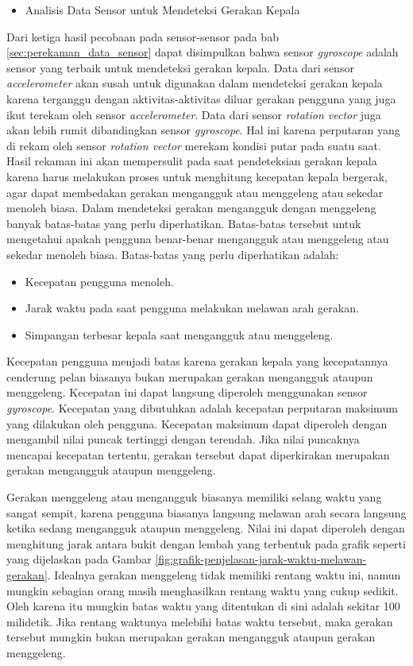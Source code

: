 \documentclass[a4paper,twoside]{article}
\begin{document}
\begin{enumerate}
\begin{itemize}
	\item Analisis Data Sensor untuk Mendeteksi Gerakan Kepala
\end{itemize}


Dari ketiga hasil pecobaan pada sensor-sensor pada bab \ref{sec:perekaman_data_sensor} dapat disimpulkan bahwa sensor \textit{gyroscope} adalah sensor yang terbaik untuk mendeteksi gerakan kepala. Data dari sensor \textit{accelerometer} akan susah untuk digunakan dalam mendeteksi gerakan kepala karena terganggu dengan aktivitas-aktivitas diluar gerakan pengguna yang juga ikut terekam oleh sensor \textit{accelerometer}. Data dari sensor \textit{rotation vector} juga akan lebih rumit dibandingkan sensor \textit{gyroscope}. Hal ini karena perputaran yang di rekam oleh sensor \textit{rotation vector} merekam kondisi putar pada suatu saat. Hasil rekaman ini akan mempersulit pada saat pendeteksian gerakan kepala karena harus melakukan proses untuk menghitung kecepatan kepala bergerak, agar dapat membedakan gerakan mengangguk atau menggeleng atau sekedar menoleh biasa. 
Dalam mendeteksi gerakan mengangguk dengan menggeleng banyak batas-batas yang perlu diperhatikan. Batas-batas tersebut untuk mengetahui apakah pengguna benar-benar mengangguk atau menggeleng atau sekedar menoleh biasa. Batas-batas yang perlu diperhatikan adalah:

\begin{itemize}
	\item Kecepatan pengguna menoleh.
	\item Jarak waktu pada saat pengguna melakukan melawan arah gerakan.
	\item Simpangan terbesar kepala saat mengangguk atau menggeleng.
\end{itemize}

Kecepatan pengguna menjadi batas karena gerakan kepala yang kecepatannya cenderung pelan biasanya bukan merupakan gerakan mengangguk ataupun menggeleng. Kecepatan ini dapat langsung diperoleh menggunakan sensor \textit{gyroscope}. Kecepatan yang dibutuhkan adalah kecepatan perputaran maksimum yang dilakukan oleh pengguna. Kecepatan maksimum dapat diperoleh dengan mengambil nilai puncak tertinggi dengan terendah. Jika nilai puncaknya mencapai kecepatan tertentu, gerakan tersebut dapat diperkirakan merupakan gerakan mengangguk ataupun menggeleng.

Gerakan menggeleng atau mengangguk biasanya memiliki selang waktu yang sangat sempit, karena pengguna biasanya langsung melawan arah secara langsung ketika sedang mengangguk ataupun menggeleng. Nilai ini dapat diperoleh dengan menghitung jarak antara bukit dengan lembah yang terbentuk pada grafik seperti yang dijelaskan pada Gambar \ref{fig:grafik-penjelasan-jarak-waktu-melawan-gerakan}. Idealnya gerakan menggeleng tidak memiliki rentang waktu ini, namun mungkin sebagian orang masih menghasilkan rentang waktu yang cukup sedikit. Oleh karena itu mungkin batas waktu yang ditentukan di sini adalah sekitar 100 milidetik. Jika rentang waktunya melebihi batas waktu tersebut, maka gerakan tersebut mungkin bukan merupakan gerakan mengangguk ataupun gerakan menggeleng. 


\end{enumerate}
\end{document}
